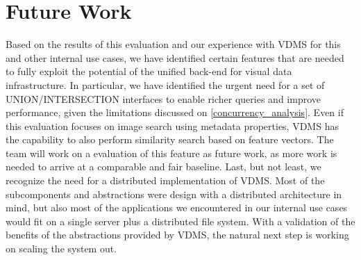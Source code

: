 \section{Future Work}

Based on the results of this evaluation and our experience with VDMS
for this and other internal use cases, we have identified certain features
that are needed to fully exploit the potential of the unified back-end
for visual data infrastructure.
In particular, we have identified the urgent need for a set of UNION/INTERSECTION
interfaces to enable richer queries and improve performance,
given the limitations discussed on \ref{concurrency_analysis}.
Even if this evaluation focuses on image search using metadata properties,
VDMS has the capability to also perform similarity search based on
feature vectors.
The team will work on a evaluation of this feature as future work,
as more work is needed to arrive at a comparable and fair baseline.
Last, but not least, we recognize the need for a distributed
implementation of VDMS.
Most of the subcomponents and abstractions were design with a distributed
architecture in mind, but also most of the applications we encountered in our
internal use cases would fit on a single server plus a distributed file system.
With a validation of the benefits of the abstractions provided by VDMS,
the natural next step is working on scaling the system out.
